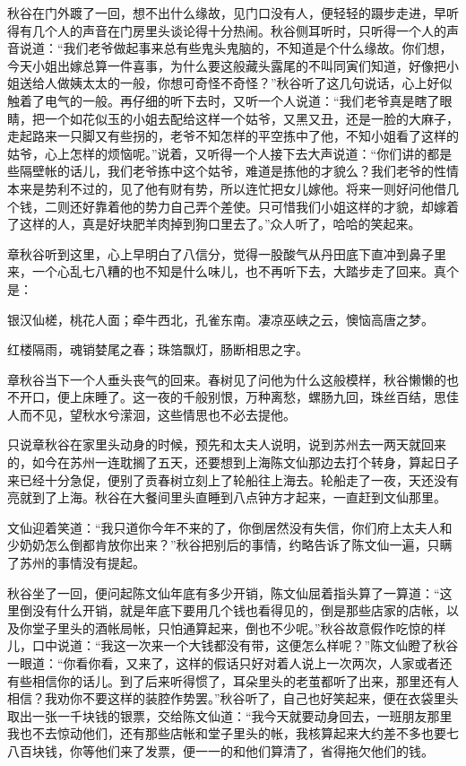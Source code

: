 \documentclass[12pt,UTF8]{ctexbook}
\begin{document}
{{{秋谷在门外踱了一回，想不出什么缘故，见门口没有人，便轻轻的蹑步走进，早听得有几个人的声音在门房里头谈论得十分热闹。秋谷侧耳听时，只听得一个人的声音说道：“我们老爷做起事来总有些鬼头鬼脑的，不知道是个什么缘故。你们想，今天小姐出嫁总算一件喜事，为什么要这般藏头露尾的不叫同寅们知道，好像把小姐送给人做姨太太的一般，你想可奇怪不奇怪？”秋谷听了这几句说话，心上好似触着了电气的一般。再仔细的听下去时，又听一个人说道：“我们老爷真是瞎了眼睛，把一个如花似玉的小姐去配给这样一个姑爷，又黑又丑，还是一脸的大麻子，走起路来一只脚又有些拐的，老爷不知怎样的平空拣中了他，不知小姐看了这样的姑爷，心上怎样的烦恼呢。”说着，又听得一个人接下去大声说道：“你们讲的都是些隔壁帐的话儿，我们老爷拣中这个姑爷，难道是拣他的才貌么？我们老爷的性情本来是势利不过的，见了他有财有势，所以连忙把女儿嫁他。将来一则好问他借几个钱，二则还好靠着他的势力自己弄个差使。只可惜我们小姐这样的才貌，却嫁着了这样的人，真是好块肥羊肉掉到狗口里去了。”众人听了，哈哈的笑起来。

章秋谷听到这里，心上早明白了八信分，觉得一股酸气从丹田底下直冲到鼻子里来，一个心乱七八糟的也不知是什么味儿，也不再听下去，大踏步走了回来。真个是：

银汉仙槎，桃花人面；牵牛西北，孔雀东南。凄凉巫峡之云，懊恼高唐之梦。

红楼隔雨，魂销婪尾之春；珠箔飘灯，肠断相思之字。

章秋谷当下一个人垂头丧气的回来。春树见了问他为什么这般模样，秋谷懒懒的也不开口，便上床睡了。这一夜的千般别恨，万种离愁，螺肠九回，珠丝百结，思佳人而不见，望秋水兮潆洄，这些情思也不必去提他。

只说章秋谷在家里头动身的时候，预先和太夫人说明，说到苏州去一两天就回来的，如今在苏州一连耽搁了五天，还要想到上海陈文仙那边去打个转身，算起日子来已经十分急促，便别了贡春树立刻上了轮船往上海去。轮船走了一夜，天还没有亮就到了上海。秋谷在大餐间里头直睡到八点钟方才起来，一直赶到文仙那里。

文仙迎着笑道：“我只道你今年不来的了，你倒居然没有失信，你们府上太夫人和少奶奶怎么倒都肯放你出来？”秋谷把别后的事情，约略告诉了陈文仙一遍，只瞒了苏州的事情没有提起。

秋谷坐了一回，便问起陈文仙年底有多少开销，陈文仙屈着指头算了一算道：“这里倒没有什么开销，就是年底下要用几个钱也看得见的，倒是那些店家的店帐，以及你堂子里头的酒帐局帐，只怕通算起来，倒也不少呢。”秋谷故意假作吃惊的样儿，口中说道：“我这一次来一个大钱都没有带，这便怎么样呢？”陈文仙瞪了秋谷一眼道：“你看你看，又来了，这样的假话只好对着人说上一次两次，人家或者还有些相信你的话儿。到了后来听得惯了，耳朵里头的老茧都听了出来，那里还有人相信？我劝你不要这样的装腔作势罢。”秋谷听了，自己也好笑起来，便在衣袋里头取出一张一千块钱的银票，交给陈文仙道：“我今天就要动身回去，一班朋友那里我也不去惊动他们，还有那些店帐和堂子里头的帐，我核算起来大约差不多也要七八百块钱，你等他们来了发票，便一一的和他们算清了，省得拖欠他们的钱。

}}}
\end{document}
